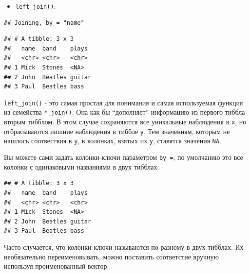 \documentclass[
]{book}
\newenvironment{Shaded}{\begin{snugshade}}{\end{snugshade}}
\newcommand{\DataTypeTok}[1]{\textcolor[rgb]{0.13,0.29,0.53}{#1}}
\newcommand{\KeywordTok}[1]{\textcolor[rgb]{0.13,0.29,0.53}{\textbf{#1}}}
\newcommand{\NormalTok}[1]{#1}
\newcommand{\OperatorTok}[1]{\textcolor[rgb]{0.81,0.36,0.00}{\textbf{#1}}}
\newcommand{\StringTok}[1]{\textcolor[rgb]{0.31,0.60,0.02}{#1}}
\providecommand{\tightlist}{%
  \setlength{\itemsep}{0pt}\setlength{\parskip}{0pt}}
\begin{document}
\begin{itemize}
\tightlist
\item
  \texttt{left\_join()}:
\end{itemize}

\begin{Shaded}
\end{Shaded}

\begin{verbatim}
## Joining, by = "name"
\end{verbatim}

\begin{verbatim}
## # A tibble: 3 x 3
##   name  band    plays 
##   <chr> <chr>   <chr> 
## 1 Mick  Stones  <NA>  
## 2 John  Beatles guitar
## 3 Paul  Beatles bass
\end{verbatim}

\texttt{left\_join()} - это самая простая для понимания и самая используемая функция из семейства \texttt{*\_join()}. Она как бы ``дополняет'' информацию из первого тиббла вторым тибблом. В этом случае сохраняются все уникальные наблюдения в \texttt{x}, но отбрасываются лишние наблюдения в тиббле \texttt{y}. Тем значениям, которым не нашлось соотвествия в \texttt{y}, в колонках, взятых их \texttt{y}, ставятся значения \texttt{NA}.

Вы можете сами задать колонки-ключи параметром \texttt{by\ =}, по умолчанию это все колонки с одинаковыми названиями в двух тибблах.

\begin{Shaded}
\end{Shaded}

\begin{verbatim}
## # A tibble: 3 x 3
##   name  band    plays 
##   <chr> <chr>   <chr> 
## 1 Mick  Stones  <NA>  
## 2 John  Beatles guitar
## 3 Paul  Beatles bass
\end{verbatim}

Часто случается, что колонки-ключи называются по-разному в двух тибблах. Их необязательно переименовывать, можно поставить соответстие вручную используя проименованный вектор:
\end{document}
